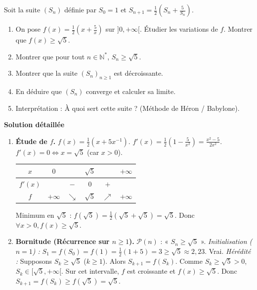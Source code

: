 \documentclass[11pt]{article}
\begin{document}
\begin{exoresolu}
    Soit la suite $(S_n)$ définie par $S_0 = 1$ et $S_{n+1} = \frac{1}{2}\left( S_n + \frac{5}{S_n} \right)$.
    \begin{enumerate}
        \item On pose $f(x) = \frac{1}{2}(x + \frac{5}{x})$ sur $]0, +\infty[$. Étudier les variations de $f$. Montrer que $f(x) \ge \sqrt{5}$.
        \item Montrer que pour tout $n \in \mathbb{N}^*$, $S_n \ge \sqrt{5}$.
        \item Montrer que la suite $(S_n)_{n \ge 1}$ est décroissante.
        \item En déduire que $(S_n)$ converge et calculer sa limite.
        \item Interprétation : À quoi sert cette suite ? (Méthode de Héron / Babylone).
    \end{enumerate}
    \tcblower
    \textbf{Solution détaillée}
    \begin{enumerate}
        \item \textbf{Étude de $f$.} $f(x) = \frac{1}{2}(x + 5x^{-1})$.
        $f'(x) = \frac{1}{2}(1 - \frac{5}{x^2}) = \frac{x^2 - 5}{2x^2}$.
        $f'(x) = 0 \Leftrightarrow x = \sqrt{5}$ (car $x>0$).
        \begin{center}
        \begin{tabular}{|c|ccccc|}\hline
        $x$ & $0$ & & $\sqrt{5}$ & & $+\infty$ \\ \hline
        $f'(x)$ & & $-$ & $0$ & $+$ & \\ \hline
        $f$ & $+\infty$ & $\searrow$ & $\sqrt{5}$ & $\nearrow$ & $+\infty$ \\ \hline
        \end{tabular}
        \end{center}
        Minimum en $\sqrt{5}$ : $f(\sqrt{5}) = \frac{1}{2}(\sqrt{5}+\sqrt{5}) = \sqrt{5}$.
        Donc $\forall x > 0, f(x) \ge \sqrt{5}$.
        \item \textbf{Bornitude (Récurrence sur $n \ge 1$).}
        $\mathcal{P}(n)$ : « $S_n \ge \sqrt{5}$ ».
        \textit{Initialisation ($n=1$) :} $S_1 = f(S_0) = f(1) = \frac{1}{2}(1+5) = 3 \ge \sqrt{5} \approx 2,23$. Vrai.
        \textit{Hérédité :} Supposons $S_k \ge \sqrt{5}$ ($k \ge 1$). Alors $S_{k+1} = f(S_k)$. Comme $S_k \ge \sqrt{5} > 0$, $S_k \in [\sqrt{5}, +\infty[$. Sur cet intervalle, $f$ est croissante et $f(x) \ge \sqrt{5}$. Donc $S_{k+1} = f(S_k) \ge f(\sqrt{5}) = \sqrt{5}$.

\end{enumerate}
\end{exoresolu}
\end{document}
